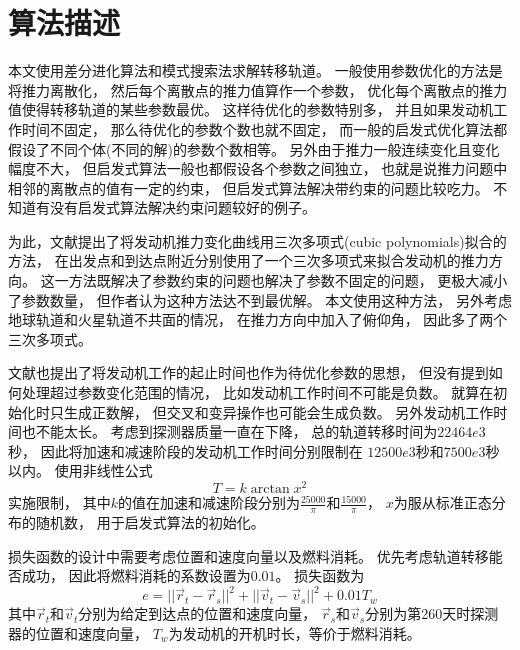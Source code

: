 \section{算法描述}
本文使用差分进化算法\cite{jqingfeng2017}和模式搜索法\cite{mbaolin2005}求解转移轨道。
一般使用参数优化的方法是将推力离散化，
然后每个离散点的推力值算作一个参数，
优化每个离散点的推力值使得转移轨道的某些参数最优。
这样待优化的参数特别多\cite{dchengxing2011}，
并且如果发动机工作时间不固定，
那么待优化的参数个数也就不固定，
而一般的启发式优化算法都假设了不同个体(不同的解)的参数个数相等。
另外由于推力一般连续变化且变化幅度不大，
但启发式算法一般也都假设各个参数之间独立，
也就是说推力问题中相邻的离散点的值有一定的约束，
但启发式算法解决带约束的问题比较吃力。
不知道有没有启发式算法解决约束问题较好的例子。

为此，文献\cite{jbradley2005}提出了将发动机推力变化曲线用三次多项式(cubic polynomials)拟合的方法，
在出发点和到达点附近分别使用了一个三次多项式来拟合发动机的推力方向。
这一方法既解决了参数约束的问题也解决了参数不固定的问题，
更极大减小了参数数量，
但作者认为这种方法达不到最优解。
本文使用这种方法，
另外考虑地球轨道和火星轨道不共面的情况，
在推力方向中加入了俯仰角，
因此多了两个三次多项式。

文献\cite{jbradley2005}也提出了将发动机工作的起止时间也作为待优化参数的思想，
但没有提到如何处理超过参数变化范围的情况，
比如发动机工作时间不可能是负数。
就算在初始化时只生成正数解，
但交叉和变异操作也可能会生成负数。
另外发动机工作时间也不能太长。
考虑到探测器质量一直在下降，
总的轨道转移时间为$22464e3$秒，
因此将加速和减速阶段的发动机工作时间分别限制在
$12500e3$秒和$7500e3$秒以内。
使用非线性公式
\[T=k\arctan{x}^2\]
实施限制，
其中$k$的值在加速和减速阶段分别为$\frac{25000}{\pi}$和$\frac{15000}{\pi}$，
$x$为服从标准正态分布的随机数，
用于启发式算法的初始化。

损失函数的设计中需要考虑位置和速度向量以及燃料消耗。
优先考虑轨道转移能否成功，
因此将燃料消耗的系数设置为$0.01$。
损失函数为
\begin{equation*}
    e = ||\vec{r}_t-\vec{r}_s||^2
    + ||\vec{v}_t-\vec{v}_s||^2
    + 0.01T_w
\end{equation*}
其中$\vec{r}_t$和$\vec{v}_t$分别为给定到达点的位置和速度向量，
$\vec{r}_s$和$\vec{v}_s$分别为第260天时探测器的位置和速度向量，
$T_w$为发动机的开机时长，等价于燃料消耗。

